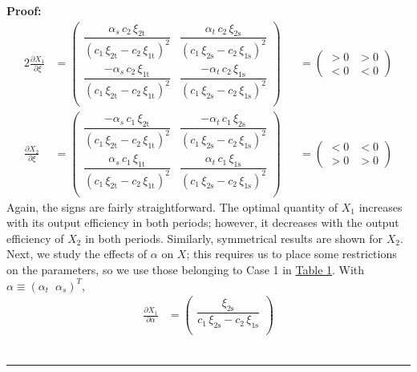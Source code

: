 \documentclass[11pt,a4paper]{extarticle}
\newenvironment{proof}[1][Proof]{\noindent\textbf{#1:} }{\ \rule{0.5em}{0.5em}}
\begin{document}
\begin{proof}
\begin{alignat*}{2}
	\frac{\partial X_1}{\partial \xi} &= 
	\begin{pmatrix}
	\dfrac{\alpha _{s}\,c_{2}\,\xi _{\mathrm{2t}}}{{\left(c_{1}\,\xi _{\mathrm{2t}}-c_{2}\,\xi _{\mathrm{1t}}\right)}^2} & \dfrac{\alpha _{t}\,c_{2}\,\xi _{\mathrm{2s}}}{{\left(c_{1}\,\xi _{\mathrm{2s}}-c_{2}\,\xi _{\mathrm{1s}}\right)}^2} \\
	\dfrac{-\alpha _{s}\,c_{2}\,\xi _{\mathrm{1t}}}{{\left(c_{1}\,\xi _{\mathrm{2t}}-c_{2}\,\xi _{\mathrm{1t}}\right)}^2} & \dfrac{-\alpha _{t}\,c_{2}\,\xi _{\mathrm{1s}}}{{\left(c_{1}\,\xi _{\mathrm{2s}}-c_{2}\,\xi _{\mathrm{1s}}\right)}^2} \\
	\end{pmatrix}
	&&=
	\begin{pmatrix}
	> 0 & > 0  \\
	< 0 & < 0
	\end{pmatrix} \\
	\frac{\partial X_2}{\partial \xi} &= 
	\begin{pmatrix}
	\dfrac{-\alpha _{s}\,c_{1}\,\xi _{\mathrm{2t}}}{{\left(c_{1}\,\xi _{\mathrm{2t}}-c_{2}\,\xi _{\mathrm{1t}}\right)}^2} & \dfrac{-\alpha _{t}\,c_{1}\,\xi _{\mathrm{2s}}}{{\left(c_{1}\,\xi _{\mathrm{2s}}-c_{2}\,\xi _{\mathrm{1s}}\right)}^2} \\
	\dfrac{\alpha _{s}\,c_{1}\,\xi _{\mathrm{1t}}}{{\left(c_{1}\,\xi _{\mathrm{2t}}-c_{2}\,\xi _{\mathrm{1t}}\right)}^2}& \dfrac{\alpha _{t}\,c_{1}\,\xi _{\mathrm{1s}}}{{\left(c_{1}\,\xi _{\mathrm{2s}}-c_{2}\,\xi _{\mathrm{1s}}\right)}^2} \\
	\end{pmatrix}
	&&=
	\begin{pmatrix}
	< 0 & < 0 \\
	> 0 & > 0  
	\end{pmatrix}
	\end{alignat*}
	Again, the signs are fairly straightforward. The optimal quantity of $X_1$ increases with its output efficiency in both periods; however, it decreases with the output efficiency of $X_2$ in both periods. Similarly, symmetrical results are shown for $X_2$. Next, we study the effects of $\alpha$ on $X$; this requires us to place some restrictions on the parameters, so we use those belonging to Case 1 in \hyperref[tab:paramrest]{Table 1}. With $\alpha \equiv \left( \alpha_t \;\; \alpha_s \right)^T$, 
	\begin{align*}
	\frac{\partial X_1}{\partial \alpha} &= 
	\begin{pmatrix}
	\dfrac{\xi _{\mathrm{2s}}}{c_{1}\,\xi _{\mathrm{2s}}-c_{2}\,\xi _{\mathrm{1s}}} \\

\end{pmatrix}
\end{align*}
\end{proof}
\end{document}

